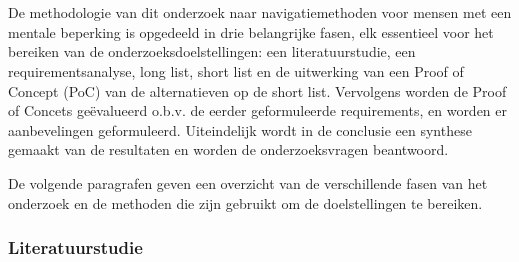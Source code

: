 
\chapter{}%
\label{ch:methodologie}


De methodologie van dit onderzoek naar navigatiemethoden voor mensen met een mentale beperking is opgedeeld in drie belangrijke fasen, elk essentieel voor het bereiken van de onderzoeksdoelstellingen: een literatuurstudie, een requirementsanalyse, long list, short list en de uitwerking van een Proof of Concept (PoC) van de alternatieven op de short list. Vervolgens worden de Proof of Concets geëvalueerd o.b.v. de eerder geformuleerde requirements, en worden er aanbevelingen geformuleerd. Uiteindelijk wordt in de conclusie een synthese gemaakt van de resultaten en worden de onderzoeksvragen beantwoord.

De volgende paragrafen geven een overzicht van de verschillende fasen van het onderzoek en de methoden die zijn gebruikt om de doelstellingen te bereiken.

\subsection*{Literatuurstudie}

